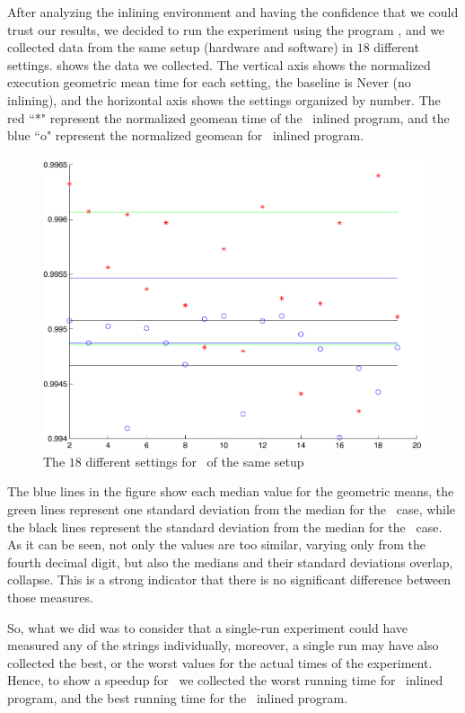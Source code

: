 After analyzing the inlining environment and having the confidence that we could trust our results, we decided to run the experiment using the program \bzip, and we collected data from the same setup (hardware and software) in $18$ different settings.  shows the data we collected. The vertical axis shows the normalized execution geometric mean time for each setting, the baseline is Never (no inlining), and the horizontal axis shows the settings organized by number. The red ``*" represent the normalized geomean time of the \FDO\ inlined program, and the blue ``o" represent the normalized geomean for \llvm\ inlined program.

\begin{figure}
  \centering
  \includegraphics[width=1.00\linewidth]{Figures/fdllrep}
  \caption{The $18$ different settings for \bzip\ of the same setup}
  \label{fig:fdllrep}
\end{figure}

The blue lines in the figure show each median value for the geometric means, the green lines represent one standard deviation from the median for the \FDI\ case, while the black lines represent the standard deviation from the median for the \llvm\ case. As it can be seen, not only the values are too similar, varying only from the fourth decimal digit, but also the medians and their standard deviations overlap, collapse. This is a strong indicator that there is no significant difference between those measures.

So, what we did was to consider that a single-run experiment could have measured any of the strings individually, moreover, a single run may have also collected the best, or the worst values for the actual times of the experiment. Hence, to show a speedup for \FDI\, we collected the worst running time for \llvm\ inlined program, and the best running time for the \FDI\ inlined program. 

